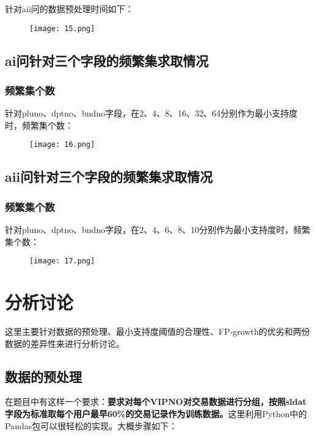 \documentclass{article}
\begin{document}
\begin{CJK}{UTF8}{gbsn}
针对aii问的数据预处理时间如下：
\begin{figure}[!h]
\begin{center}
  \texttt{[image: 15.png]}	
\end{center}
\end{figure}

\clearpage
\subsection{ai问针对三个字段的频繁集求取情况}

\subsubsection{频繁集个数}
针对pluno、dptno、bndno字段，在2、4、8、16、32、64分别作为最小支持度时，频繁集个数：

\begin{figure}[!h]
\begin{center}
  \texttt{[image: 16.png]}	
\end{center}
\end{figure}


\subsection{aii问针对三个字段的频繁集求取情况}

\subsubsection{频繁集个数}
针对pluno、dptno、bndno字段，在2、4、6、8、10分别作为最小支持度时，频繁集个数：

\begin{figure}[!h]
\begin{center}
  \texttt{[image: 17.png]}	
\end{center}
\end{figure}


\section{分析讨论}
这里主要针对数据的预处理、最小支持度阈值的合理性、FP-growth的优劣和两份数据的差异性来进行分析讨论。

\subsection{数据的预处理}
在题目中有这样一个要求：\textbf{要求对每个VIPNO对交易数据进行分组，按照sldat字段为标准取每个用户最早60\%的交易记录作为训练数据。}这里利用Python中的Pandas包可以很轻松的实现。大概步骤如下：


\end{CJK}
\end{document}
